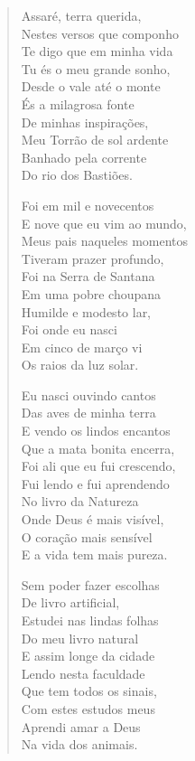 \begin{verse}
Assaré, terra querida,\\
Nestes versos que componho\\
Te digo que em minha vida\\
Tu és o meu grande sonho,\\
Desde o vale até o monte\\
És a milagrosa fonte\\
De minhas inspirações,\\
Meu Torrão de sol ardente\\
Banhado pela corrente\\
Do rio dos Bastiões.

Foi em mil e novecentos\\
E nove que eu vim ao mundo,\\
Meus pais naqueles momentos\\
Tiveram prazer profundo,\\
Foi na Serra de Santana\\
Em uma pobre choupana\\
Humilde e modesto lar,\\
Foi onde eu nasci\\
Em cinco de março vi\\
Os raios da luz solar.

Eu nasci ouvindo cantos\\
Das aves de minha terra\\
E vendo os lindos encantos\\
Que a mata bonita encerra,\\
Foi ali que eu fui crescendo,\\
Fui lendo e fui aprendendo\\
No livro da Natureza\\
Onde Deus é mais visível,\\
O coração mais sensível\\
E a vida tem mais pureza.

Sem poder fazer escolhas\\
De livro artificial,\\
Estudei nas lindas folhas\\
Do meu livro natural\\
E assim longe da cidade\\
Lendo nesta faculdade\\
Que tem todos os sinais,\\
Com estes estudos meus\\
Aprendi amar a Deus\\
Na vida dos animais.


\end{verse}

